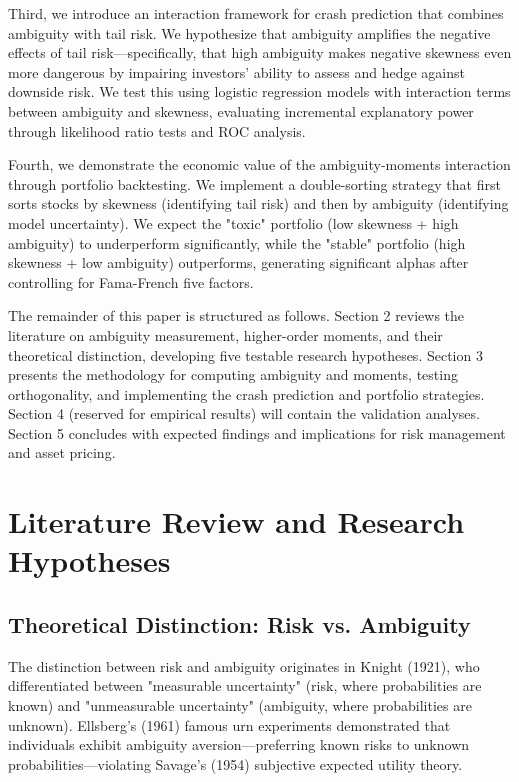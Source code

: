 \documentclass[preprint,12pt,authoryear]{elsarticle}
\begin{document}
Third, we introduce an interaction framework for crash prediction that combines ambiguity with tail risk. We hypothesize that ambiguity amplifies the negative effects of tail risk—specifically, that high ambiguity makes negative skewness even more dangerous by impairing investors' ability to assess and hedge against downside risk. We test this using logistic regression models with interaction terms between ambiguity and skewness, evaluating incremental explanatory power through likelihood ratio tests and ROC analysis.

Fourth, we demonstrate the economic value of the ambiguity-moments interaction through portfolio backtesting. We implement a double-sorting strategy that first sorts stocks by skewness (identifying tail risk) and then by ambiguity (identifying model uncertainty). We expect the "toxic" portfolio (low skewness + high ambiguity) to underperform significantly, while the "stable" portfolio (high skewness + low ambiguity) outperforms, generating significant alphas after controlling for Fama-French five factors.

The remainder of this paper is structured as follows. Section 2 reviews the literature on ambiguity measurement, higher-order moments, and their theoretical distinction, developing five testable research hypotheses. Section 3 presents the methodology for computing ambiguity and moments, testing orthogonality, and implementing the crash prediction and portfolio strategies. Section 4 (reserved for empirical results) will contain the validation analyses. Section 5 concludes with expected findings and implications for risk management and asset pricing.

\section{Literature Review and Research Hypotheses}

\subsection{Theoretical Distinction: Risk vs. Ambiguity}

The distinction between risk and ambiguity originates in Knight (1921), who differentiated between "measurable uncertainty" (risk, where probabilities are known) and "unmeasurable uncertainty" (ambiguity, where probabilities are unknown). Ellsberg's (1961) famous urn experiments demonstrated that individuals exhibit ambiguity aversion—preferring known risks to unknown probabilities—violating Savage's (1954) subjective expected utility theory.
\end{document}
